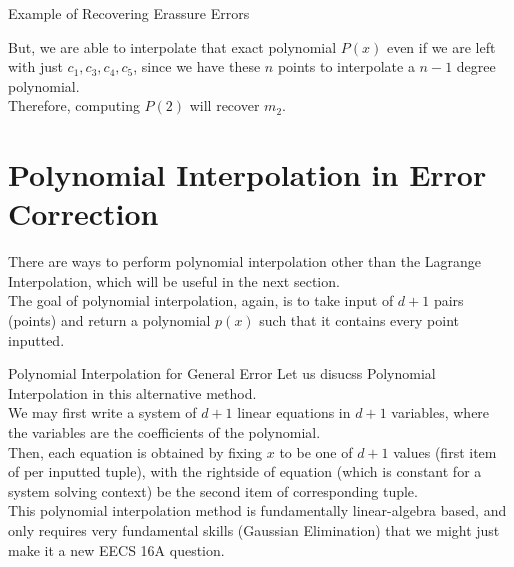 \begin{ln-think}{Example of Recovering Erassure Errors}{}
\begin{center}
    \end{center}
    But, we are able to interpolate that exact polynomial $P(x)$ even if we are left with just $c_1, c_3, c_4, c_5$, since we have these $n$ points to interpolate a $n - 1$ degree polynomial. \\
    Therefore, computing $P(2)$ will recover $m_2$.
\end{ln-think}

\section{Polynomial Interpolation in Error Correction}
There are ways to perform polynomial interpolation other than the Lagrange Interpolation, which will be useful in the next section. \\
The goal of polynomial interpolation, again, is to take input of $d + 1$ pairs (points) and return a polynomial $p(x)$ such that it contains every point inputted. \\

\begin{ln-theorem}{Polynomial Interpolation for General Error}{}
    Let us disucss Polynomial Interpolation in this alternative method. \\
    We may first write a system of $d + 1$ linear equations in $d + 1$ variables, where the variables are the coefficients of the polynomial. \\
    Then, each equation is obtained by fixing $x$ to be one of $d + 1$ values (first item of per inputted tuple), with the rightside of equation (which is constant for a system solving context) be the second item of corresponding tuple. \\
    This polynomial interpolation method is fundamentally linear-algebra based, and only requires very fundamental skills (Gaussian Elimination) that we might just make it a new EECS 16A question.
\end{ln-theorem}

